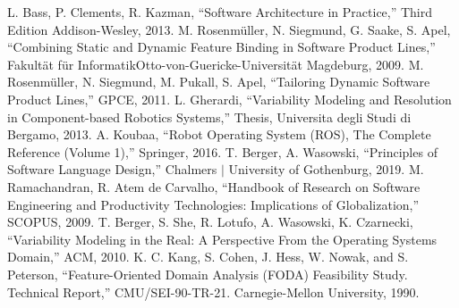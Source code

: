 \documentclass[conference]{IEEEtran}
\begin{document}
\begin{thebibliography}{00}
 L. Bass, P. Clements, R. Kazman, ``Software Architecture in Practice,'' Third Edition Addison-Wesley, 2013.
 M. Rosenmüller, N. Siegmund, G. Saake, S. Apel, ``Combining Static and Dynamic Feature Binding in
Software Product Lines,'' Fakultät für InformatikOtto-von-Guericke-Universität Magdeburg, 2009.
 M. Rosenmüller, N. Siegmund, M. Pukall, S. Apel, ``Tailoring Dynamic Software Product Lines,'' GPCE, 2011.
 L. Gherardi, ``Variability Modeling and Resolution in Component-based Robotics Systems,'' Thesis,  Universita degli Studi di Bergamo, 2013.
 A. Koubaa, ``Robot Operating System (ROS), The Complete Reference (Volume 1),'' Springer, 2016.
 T. Berger, A. Wasowski, ``Principles of Software Language Design,'' Chalmers $|$ University of Gothenburg, 2019.
 M. Ramachandran, R. Atem de Carvalho, ``Handbook of Research on Software Engineering and Productivity Technologies: Implications of Globalization,'' SCOPUS, 2009.
 T. Berger, S. She, R. Lotufo, A. Wasowski, K. Czarnecki, ``Variability Modeling in the Real: A Perspective From the Operating Systems Domain,'' ACM, 2010.
 K. C. Kang, S. Cohen, J. Hess, W. Nowak, and S. Peterson, ``Feature-Oriented Domain Analysis (FODA) Feasibility Study. Technical
Report,'' CMU/SEI-90-TR-21. Carnegie-Mellon University, 1990.
\end{thebibliography}
\vspace{12pt}
\end{document}
